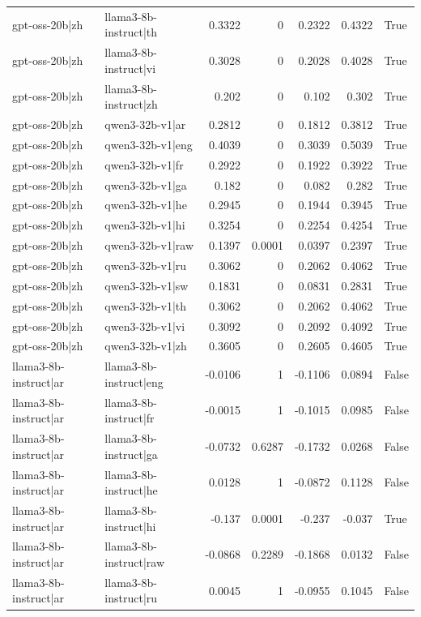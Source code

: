 \begin{table}
\begin{tabular}{l l r r r r l}
gpt-oss-20b|zh & llama3-8b-instruct|th & 0.3322 & 0 & 0.2322 & 0.4322 & True \\
gpt-oss-20b|zh & llama3-8b-instruct|vi & 0.3028 & 0 & 0.2028 & 0.4028 & True \\
gpt-oss-20b|zh & llama3-8b-instruct|zh & 0.202 & 0 & 0.102 & 0.302 & True \\
gpt-oss-20b|zh & qwen3-32b-v1|ar & 0.2812 & 0 & 0.1812 & 0.3812 & True \\
gpt-oss-20b|zh & qwen3-32b-v1|eng & 0.4039 & 0 & 0.3039 & 0.5039 & True \\
gpt-oss-20b|zh & qwen3-32b-v1|fr & 0.2922 & 0 & 0.1922 & 0.3922 & True \\
gpt-oss-20b|zh & qwen3-32b-v1|ga & 0.182 & 0 & 0.082 & 0.282 & True \\
gpt-oss-20b|zh & qwen3-32b-v1|he & 0.2945 & 0 & 0.1944 & 0.3945 & True \\
gpt-oss-20b|zh & qwen3-32b-v1|hi & 0.3254 & 0 & 0.2254 & 0.4254 & True \\
gpt-oss-20b|zh & qwen3-32b-v1|raw & 0.1397 & 0.0001 & 0.0397 & 0.2397 & True \\
gpt-oss-20b|zh & qwen3-32b-v1|ru & 0.3062 & 0 & 0.2062 & 0.4062 & True \\
gpt-oss-20b|zh & qwen3-32b-v1|sw & 0.1831 & 0 & 0.0831 & 0.2831 & True \\
gpt-oss-20b|zh & qwen3-32b-v1|th & 0.3062 & 0 & 0.2062 & 0.4062 & True \\
gpt-oss-20b|zh & qwen3-32b-v1|vi & 0.3092 & 0 & 0.2092 & 0.4092 & True \\
gpt-oss-20b|zh & qwen3-32b-v1|zh & 0.3605 & 0 & 0.2605 & 0.4605 & True \\
llama3-8b-instruct|ar & llama3-8b-instruct|eng & -0.0106 & 1 & -0.1106 & 0.0894 & False \\
llama3-8b-instruct|ar & llama3-8b-instruct|fr & -0.0015 & 1 & -0.1015 & 0.0985 & False \\
llama3-8b-instruct|ar & llama3-8b-instruct|ga & -0.0732 & 0.6287 & -0.1732 & 0.0268 & False \\
llama3-8b-instruct|ar & llama3-8b-instruct|he & 0.0128 & 1 & -0.0872 & 0.1128 & False \\
llama3-8b-instruct|ar & llama3-8b-instruct|hi & -0.137 & 0.0001 & -0.237 & -0.037 & True \\
llama3-8b-instruct|ar & llama3-8b-instruct|raw & -0.0868 & 0.2289 & -0.1868 & 0.0132 & False \\
llama3-8b-instruct|ar & llama3-8b-instruct|ru & 0.0045 & 1 & -0.0955 & 0.1045 & False \\

\end{tabular}
\end{table}
